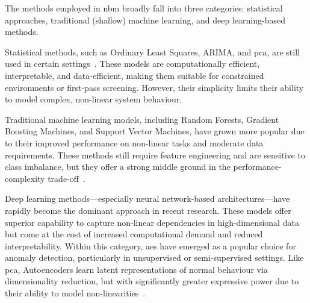 
The methods employed in \gls{nbm} broadly fall into three categories: statistical approaches, traditional (shallow) machine learning, and deep learning-based methods.

Statistical methods, such as Ordinary Least Squares, ARIMA, and \gls{pca}, are still used in certain settings~\citep{chesterman_overview_2023}.
These models are computationally efficient, interpretable, and data-efficient, making them suitable for constrained environments or first-pass screening.
However, their simplicity limits their ability to model complex, non-linear system behaviour.

Traditional machine learning models, including Random Forests, Gradient Boosting Machines, and Support Vector Machines, have grown more popular due to their improved performance on non-linear tasks and moderate data requirements.
These methods still require feature engineering and are sensitive to class imbalance, but they offer a strong middle ground in the performance-complexity trade-off~\citep{ben_ali_online_2018, bilendo_normal_2022, liu_wind_2022}.

Deep learning methods—especially neural network-based architectures—have rapidly become the dominant approach in recent research.
These models offer superior capability to capture non-linear dependencies in high-dimensional data but come at the cost of increased computational demand and reduced interpretability.
Within this category, \glspl{ae} have emerged as a popular choice for anomaly detection, particularly in unsupervised or semi-supervised settings.
Like \gls{pca}, Autoencoders learn latent representations of normal behaviour via dimensionality reduction, but with significantly greater expressive power due to their ability to model non-linearities~\cite{chesterman_overview_2023,ahmad_autoencoder-based_2020}.


